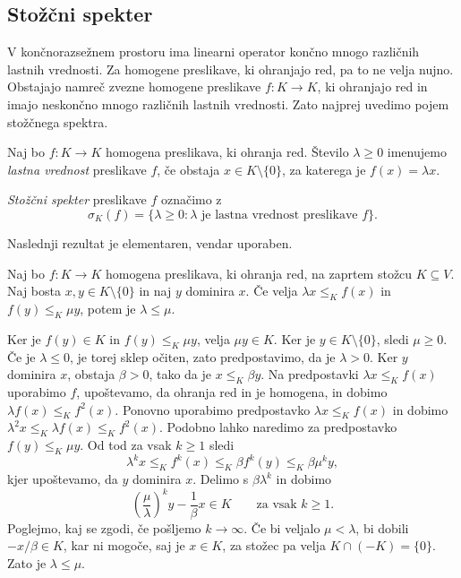 \documentclass[mat2, tisk]{fmfdelo}
\begin{document}
\subsection{Stožčni spekter}


V končnorazsežnem prostoru ima linearni operator končno
mnogo različnih lastnih vrednosti. Za homogene preslikave,
ki ohranjajo red, pa to ne velja nujno. Obstajajo namreč
zvezne homogene preslikave $f\colon K\longrightarrow K$,
ki ohranjajo red in imajo neskončno mnogo različnih
lastnih vrednosti. Zato najprej uvedimo pojem stožčnega
spektra.

\begin{definicija}
  Naj bo $f\colon K\longrightarrow K$ homogena preslikava, ki ohranja red.
  Število $\lambda\geq0$ imenujemo \emph{lastna vrednost} preslikave $f$,
  če obstaja $x\in K\setminus\{0\}$, za katerega je $f(x)=\lambda x$.
  
  \emph{Stožčni spekter} preslikave $f$ označimo z
  \[
  \sigma_K(f)=\{\lambda\geq0:\lambda\text{ je lastna vrednost preslikave }f\}.
  \]
\end{definicija}

Naslednji rezultat je elementaren, vendar uporaben.

\begin{lema}\label{lema:primerjava_lastnih_vrednosti}
Naj bo $f\colon K\longrightarrow K$ homogena preslikava, ki ohranja red,
na zaprtem stožcu $K\subseteq V$. Naj bosta $x,y\in K\setminus\{0\}$ in
naj $y$ dominira $x$. Če velja $\lambda x\leq_K f(x)$ in
$f(y)\leq_K\mu y$, potem je $\lambda\leq\mu$.
\end{lema}

\begin{dokaz}
Ker je $f(y)\in K$ in $f(y)\leq_K\mu y$, velja
$\mu y\in K$. Ker je $y\in K\setminus\{0\}$,
sledi $\mu\geq0$. Če je $\lambda\leq0$, je
torej sklep očiten, zato predpostavimo, da je
$\lambda>0$.
Ker $y$ dominira $x$, obstaja $\beta>0$, tako da je $x\leq_K\beta y$.
Na predpostavki $\lambda x\leq_K f(x)$ uporabimo $f$, upoštevamo, da ohranja red in je homogena, in dobimo
$\lambda f(x)\leq_K f^2(x)$. Ponovno uporabimo predpostavko $\lambda x\leq_K f(x)$ in dobimo
$\lambda^2 x \leq_K \lambda f(x) \leq_K f^2(x)$.
Podobno lahko naredimo za predpostavko $f(y)\leq_K\mu y$.
Od tod za vsak $k\geq1$ sledi
\[
\lambda^k x
\leq_K f^k(x)
\leq_K \beta f^k(y)
\leq_K \beta\mu^k y,
\]
kjer upoštevamo, da $y$ dominira $x$. Delimo s $\beta\lambda^k$ in dobimo
\[
\left(\frac{\mu}{\lambda}\right)^k y-\frac{1}{\beta}x\in K
\qquad\text{za vsak }k\geq1.
\]
Poglejmo, kaj se zgodi, če pošljemo $k\to\infty$. Če bi veljalo $\mu<\lambda$, bi dobili $-x/\beta\in K$, 
kar ni mogoče, saj je $x\in K$, za stožec pa velja $K\cap(-K)=\{0\}$. Zato je $\lambda\leq\mu$.
\end{dokaz}
\end{document}
